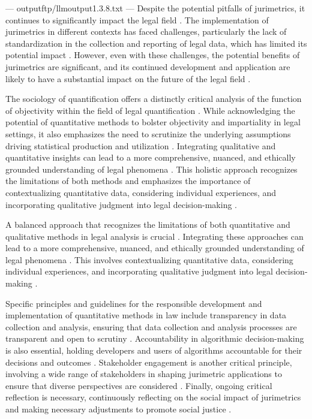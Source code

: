 ---
outputftp/llmoutput1.3.8.txt
---
Despite the potential pitfalls of jurimetrics, it continues to significantly impact the legal field \cite{10.1007/s11186-021-09453-1,10.3390/fi9040068}. The implementation of jurimetrics in different contexts has faced challenges, particularly the lack of standardization in the collection and reporting of legal data, which has limited its potential impact \cite{10.1007/s11186-021-09453-1,10.3390/fi9040068}. However, even with these challenges, the potential benefits of jurimetrics are significant, and its continued development and application are likely to have a substantial impact on the future of the legal field \cite{10.1007/s11186-021-09453-1,10.3390/fi9040068}.

The sociology of quantification offers a distinctly critical analysis of the function of objectivity within the field of legal quantification \cite{10.1007/s11186-021-09453-1,10.3390/fi9040068}. While acknowledging the potential of quantitative methods to bolster objectivity and impartiality in legal settings, it also emphasizes the need to scrutinize the underlying assumptions driving statistical production and utilization \cite{10.1007/s11186-021-09453-1,10.3390/fi9040068}. Integrating qualitative and quantitative insights can lead to a more comprehensive, nuanced, and ethically grounded understanding of legal phenomena \cite{10.1007/s11186-021-09453-1,10.3390/fi9040068}. This holistic approach recognizes the limitations of both methods and emphasizes the importance of contextualizing quantitative data, considering individual experiences, and incorporating qualitative judgment into legal decision-making \cite{10.1007/s11186-021-09453-1,10.3390/fi9040068}.

A balanced approach that recognizes the limitations of both quantitative and qualitative methods in legal analysis is crucial \cite{10.1007/s11186-021-09453-1,10.3390/fi9040068}. Integrating these approaches can lead to a more comprehensive, nuanced, and ethically grounded understanding of legal phenomena \cite{10.1007/s11186-021-09453-1,10.3390/fi9040068}. This involves contextualizing quantitative data, considering individual experiences, and incorporating qualitative judgment into legal decision-making \cite{10.1007/s11186-021-09453-1,10.3390/fi9040068}.

Specific principles and guidelines for the responsible development and implementation of quantitative methods in law include transparency in data collection and analysis, ensuring that data collection and analysis processes are transparent and open to scrutiny \cite{10.1007/s11186-021-09453-1,10.3390/fi9040068}. Accountability in algorithmic decision-making is also essential, holding developers and users of algorithms accountable for their decisions and outcomes \cite{10.1007/s11186-021-09453-1,10.3390/fi9040068}. Stakeholder engagement is another critical principle, involving a wide range of stakeholders in shaping jurimetric applications to ensure that diverse perspectives are considered \cite{10.1007/s11186-021-09453-1,10.3390/fi9040068}. Finally, ongoing critical reflection is necessary, continuously reflecting on the social impact of jurimetrics and making necessary adjustments to promote social justice \cite{10.1007/s11186-021-09453-1,10.3390/fi9040068}.


